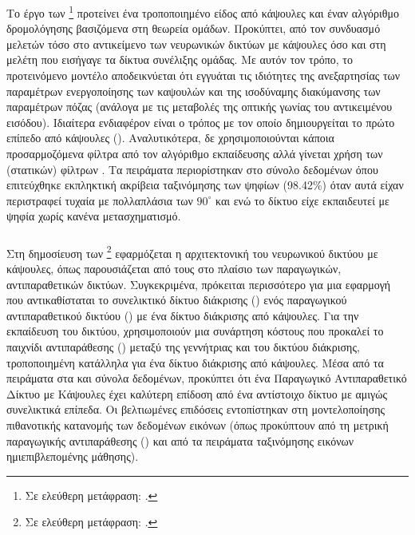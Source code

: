 \subsubsection{}

Το έργο των  \footnote{Σε ελεύθερη μετάφραση: .} \cite{lenssen2018group} προτείνει ένα τροποποιημένο είδος από κάψουλες και έναν αλγόριθμο δρομολόγησης βασιζόμενα στη θεωρεία ομάδων. Προκύπτει, από τον συνδυασμό μελετών τόσο στο αντικείμενο των νευρωνικών δικτύων με κάψουλες όσο και στη μελέτη που εισήγαγε τα δίκτυα συνέλιξης ομάδας\cite{cohen2016group}. Με αυτόν τον τρόπο, το προτεινόμενο μοντέλο αποδεικνύεται ότι εγγυάται τις ιδιότητες της ανεξαρτησίας των παραμέτρων ενεργοποίησης των καψουλών και της ισοδύναμης διακύμανσης των παραμέτρων πόζας (ανάλογα με τις μεταβολές της οπτικής γωνίας του αντικειμένου εισόδου). Ιδιαίτερα ενδιαφέρον είναι ο τρόπος με τον οποίο δημιουργείται το πρώτο επίπεδο από κάψουλες (). Αναλυτικότερα, δε χρησιμοποιούνται κάποια προσαρμοζόμενα φίλτρα από τον αλγόριθμο εκπαίδευσης αλλά γίνεται χρήση των (στατικών) φίλτρων . Τα πειράματα περιορίστηκαν στο σύνολο δεδομένων  όπου επιτεύχθηκε εκπληκτική ακρίβεια ταξινόμησης των ψηφίων (98.42\%) όταν αυτά είχαν περιστραφεί τυχαία με πολλαπλάσια των $90^{\circ}$ και ενώ το δίκτυο είχε εκπαιδευτεί με ψηφία χωρίς κανένα μετασχηματισμό.


\subsubsection{}

Στη δημοσίευση των  \footnote{Σε ελεύθερη μετάφραση: .}\cite{jaiswal2018capsulegan} εφαρμόζεται η αρχιτεκτονική του νευρωνικού δικτύου με κάψουλες, όπως παρουσιάζεται από τους \cite{sabour2017dynamic} στο πλαίσιο των παραγωγικών, αντιπαραθετικών δικτύων. Συγκεκριμένα, πρόκειται περισσότερο για μια εφαρμογή που αντικαθίσταται το συνελικτικό δίκτυο διάκρισης () ενός παραγωγικού αντιπαραθετικού δικτύου () με ένα δίκτυο διάκρισης από κάψουλες. Για την εκπαίδευση του δικτύου, χρησιμοποιούν μια συνάρτηση κόστους που προκαλεί το παιχνίδι αντιπαράθεσης () μεταξύ της γεννήτριας και του δικτύου διάκρισης, τροποποιημένη κατάλληλα για ένα δίκτυο διάκρισης από κάψουλες. Μέσα από τα πειράματα στα  και  σύνολα δεδομένων, προκύπτει ότι ένα Παραγωγικό Αντιπαραθετικό Δίκτυο με Κάψουλες έχει καλύτερη επίδοση από ένα αντίστοιχο δίκτυο με αμιγώς συνελικτικά επίπεδα. Οι βελτιωμένες επιδόσεις εντοπίστηκαν στη μοντελοποίησης πιθανοτικής κατανομής των δεδομένων εικόνων (όπως προκύπτουν από τη μετρική παραγωγικής αντιπαράθεσης ()\cite{im2016generative} και από τα πειράματα ταξινόμησης εικόνων ημι\textendash επιβλεπομένης μάθησης).


